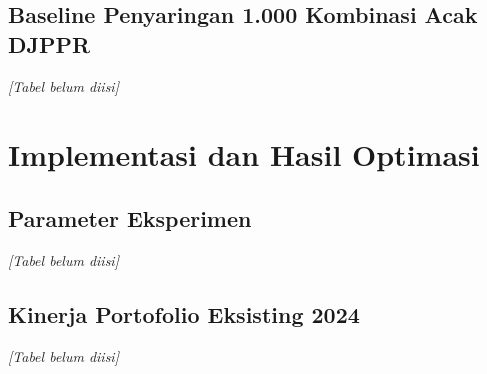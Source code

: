         \subsection{Baseline Penyaringan 1.000 Kombinasi Acak DJPPR}\label{subsec:baseline}

        \begin{table}[H]
            \centering
            \caption{Baseline 1.000 portofolio acak DJPPR dan solusi referensi SLSQP}\label{tab:baseline}
            \textit{[Tabel belum diisi]}
        \end{table}

    \section{Implementasi dan Hasil Optimasi}\label{sec:optimization results}

        \subsection{Parameter Eksperimen}\label{subsec:experiment params}

        \begin{table}[H]
            \centering
            \caption{Parameter eksperimen}\label{tab:experiment params}
            \textit{[Tabel belum diisi]}
        \end{table}

        \subsection{Kinerja Portofolio Eksisting 2024}\label{subsec:existing performance}

        \begin{table}[H]
            \centering
            \caption{Kinerja portofolio eksisting 2024 pada bank latih dan bank validasi}\label{tab:existing performance}
            \textit{[Tabel belum diisi]}
        \end{table}

